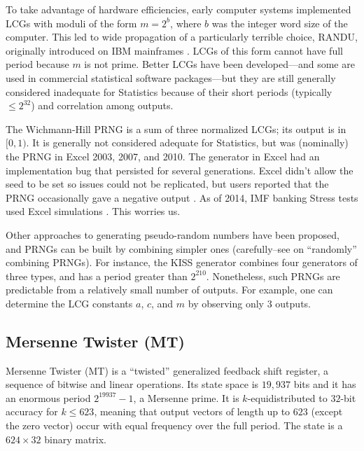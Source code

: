 \documentclass[graybox]{svmult}
\begin{document}
To take advantage of hardware efficiencies, early computer systems implemented LCGs 
with moduli of the form 
$m = 2^b$, where
$b$ was the integer word size of the computer.
This led to wide propagation of a particularly terrible choice, RANDU, originally introduced
on IBM mainframes \cite{knuth_art_1997,markowsky14}.
LCGs of this form cannot have full period because $m$ is not prime. 
Better LCGs have been developed---and some are used in commercial statistical software packages---but they are still
generally considered inadequate for Statistics because of their short periods (typically $ \le 2^{32}$) 
and correlation among outputs.

The Wichmann-Hill PRNG is a sum of three normalized LCGs; its output is in $[0, 1)$.
%
It is generally not considered adequate for Statistics, but was (nominally) the PRNG in Excel 
2003, 2007, and 2010. 
The generator in Excel had an implementation bug that persisted for several generations.
Excel didn't allow the seed to be set so issues could not be replicated, but users reported that the PRNG occasionally gave a negative output \cite{mccullough_microsoft_2008}.
As of 2014, IMF banking Stress tests used Excel simulations \cite{ong14}.
This worries us.

Other approaches to generating pseudo-random numbers have been
proposed, and PRNGs can be built by combining simpler ones (carefully--see \cite{knuth_art_1997} on ``randomly'' combining PRNGs).
For instance, the KISS generator combines four generators of three types, and has a period greater than $2^{210}$.
Nonetheless, such PRNGs are predictable from a relatively small number of outputs.
For example, one can determine the LCG constants $a$, $c$, and $m$ by observing only 3 outputs.


\subsection{Mersenne Twister (MT)}

Mersenne Twister (MT) \cite{matsumoto_mersenne_1998} is a ``twisted'' generalized feedback shift register, a sequence of bitwise and linear operations.
Its state space is $19,937$ bits and it has an enormous period $2^{19937}-1$, a Mersenne prime.
It is $k$-equidistributed to $32$-bit accuracy for $k \leq 623$, 
meaning that output vectors of length up to $623$ (except the zero vector) occur with equal frequency over the full period.
The state is a $624 \times 32$ binary matrix.
\end{document}
